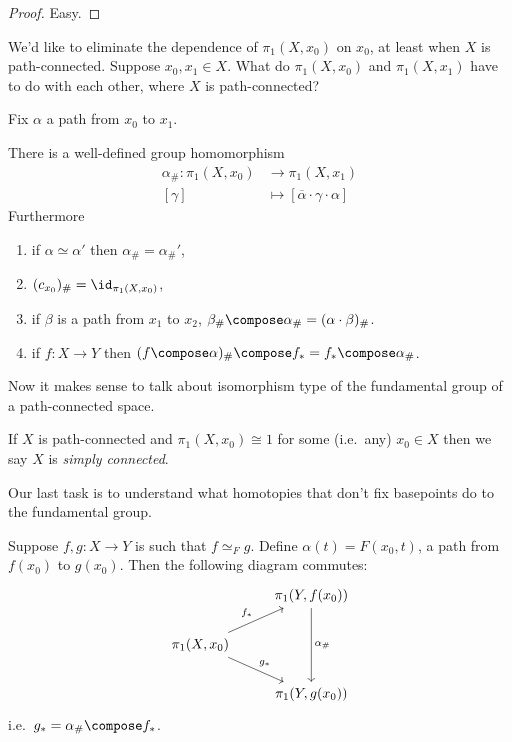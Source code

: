 \documentclass[a4paper]{article}
\begin{document}
\begin{proof}
  Easy.
\end{proof}

We'd like to eliminate the dependence of \(\pi_1(X, x_0)\) on \(x_0\), at least when \(X\) is path-connected. Suppose \(x_0, x_1 \in X\). What do \(\pi_1(X, x_0)\) and \(\pi_1(X, x_1)\) have to do with each other, where \(X\) is path-connected?

Fix \(\alpha\) a path from \(x_0\) to \(x_1\).

\begin{lemma}
  There is a well-defined group homomorphism
  \begin{align*}
    \alpha_\#: \pi_1(X, x_0) &\to \pi_1(X, x_1) \\
    [\gamma] &\mapsto [\overline \alpha \cdot \gamma \cdot \alpha]
  \end{align*}
  Furthermore
  \begin{enumerate}
  \item if \(\alpha \simeq \alpha'\) then \(\alpha_\# = \alpha_\#'\),
  \item \((c_{x_0})_\# = \id_{\pi_1(X, x_0)}\),
  \item if \(\beta\) is a path from \(x_1\) to \(x_2\), \(\beta_\# \compose \alpha_\# = (\alpha \cdot \beta)_\#\).
  \item if \(f: X \to Y\) then \((f \compose \alpha)_\# \compose f_* = f_* \compose \alpha_\#\).
  \end{enumerate}
\end{lemma}

Now it makes sense to talk about isomorphism type of the fundamental group of a path-connected space.

\begin{definition}
  If \(X\) is path-connected and \(\pi_1(X, x_0) \cong 1\) for some (i.e.\ any) \(x_0 \in X\) then we say \(X\) is \emph{simply connected}.
\end{definition}

Our last task is to understand what homotopies that don't fix basepoints do to the fundamental group.

\begin{lemma}
  Suppose \(f, g: X \to Y\) is such that \(f \simeq_F g\). Define \(\alpha(t) = F(x_0, t)\), a path from \(f(x_0)\) to \(g(x_0)\). Then the following diagram commutes:
\[
  \begin{tikzcd}
    & \pi_1(Y, f(x_0)) \ar[dd, "\alpha_\#"] \\
    \pi_1(X, x_0) \ar[ur, "f_*"] \ar[dr, "g_*"] \\
    & \pi_1(Y, g(x_0))
  \end{tikzcd}
\]
i.e.\ \(g_* = \alpha_\# \compose f_*\).
\end{lemma}
\end{document}
